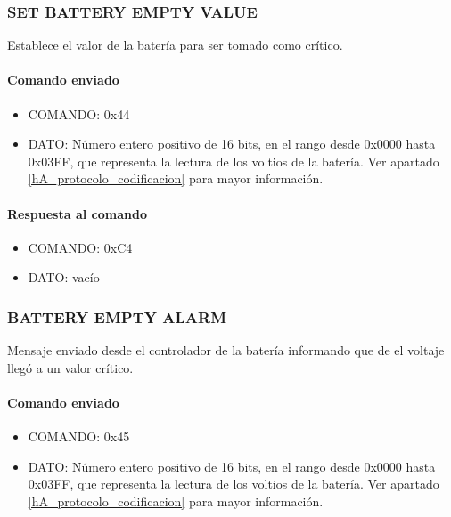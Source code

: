 \subsubsection{SET BATTERY EMPTY VALUE}
\label{hA_protocolo_set_battery_empty_value}

Establece el valor de la bater\'ia para ser tomado como cr\'itico.

\paragraph*{Comando enviado}

\begin{itemize}
	\item{COMANDO:} 0x44
	\item{DATO:} N\'umero entero positivo de 16 bits, en el rango desde 0x0000 hasta 0x03FF, que representa la lectura de los voltios de la bater\'ia.
		Ver apartado \ref{hA_protocolo_codificacion} para mayor informaci\'on.
\end{itemize}

\paragraph*{Respuesta al comando}

\begin{itemize}
	\item{COMANDO:} 0xC4
	\item{DATO:} vac\'io
\end{itemize}

\subsubsection{BATTERY EMPTY ALARM}
\label{hA_protocolo_battery_empty}

Mensaje enviado desde el controlador de la bater\'ia informando que de el voltaje lleg\'o a un valor cr\'itico.

\paragraph*{Comando enviado}

\begin{itemize}
	\item{COMANDO:} 0x45
	\item{DATO:} N\'umero entero positivo de 16 bits, en el rango desde 0x0000 hasta 0x03FF, que representa la lectura de los voltios de la bater\'ia.
		Ver apartado \ref{hA_protocolo_codificacion} para mayor informaci\'on.
\end{itemize}

